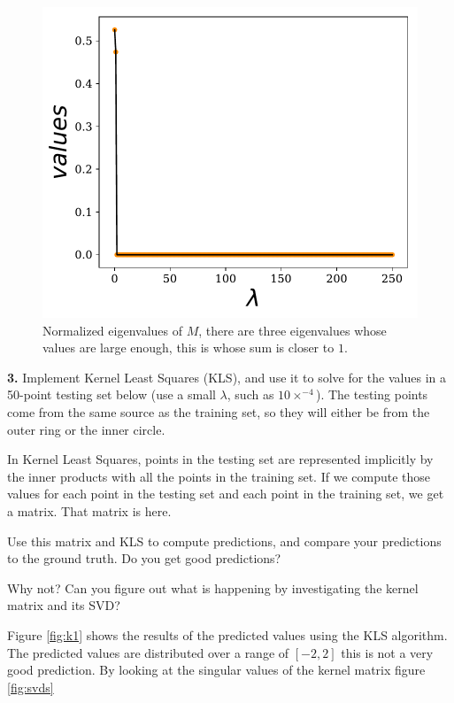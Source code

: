 \documentclass[14pt]{article}
\begin{document}
\begin{figure}[H]
\centering
\includegraphics[scale=0.5]{M_eigval.pdf}
\caption{ Normalized eigenvalues of $M$, there are three eigenvalues whose values
are large enough, this is whose sum is closer to $1$.}
\end{figure}

\newpage

\begin{mdframed}
\textbf{3.} Implement Kernel Least Squares (KLS), and use it to solve for the
values in a 50-point testing set below (use a small $\lambda$, such as
$10\times^{−4}$). The testing points come from the same source as the training set,
so they will either be from the outer ring or the inner circle.

In Kernel Least Squares, points in the testing set are represented
implicitly by the inner products with all the points in the training
set. If we compute those values for each point in the testing set and
each point in the training set, we get a matrix. That matrix is here.

Use this matrix and KLS to compute predictions, and compare your
predictions to the ground truth. Do you get good predictions?

Why not? Can you figure out what is happening by investigating the
kernel matrix and its SVD?
\end{mdframed}


Figure \ref{fig:k1} shows the results of the predicted values
using the KLS algorithm. The predicted values are distributed over a
range of $[-2, 2]$ this is not a very good prediction. By looking at
the singular values of the kernel matrix figure \ref{fig:svds}
\end{document}
